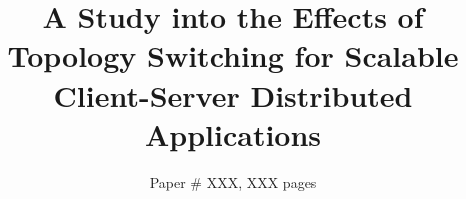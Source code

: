 \documentclass[sigconf]{acmart}
\begin{document}
\title{A Study into the Effects of Topology Switching for Scalable Client-Server Distributed Applications}


\author{Paper \# XXX, XXX pages}

\renewcommand{\shortauthors}{X.et al.}

\begin{abstract}
\end{abstract}

\maketitle





\end{document}
